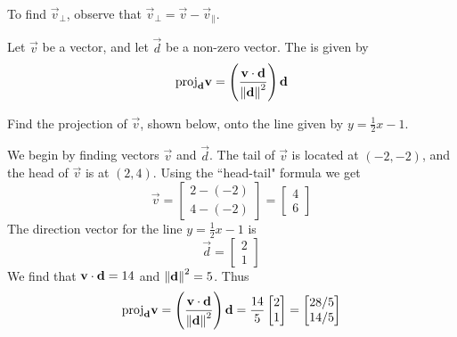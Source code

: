 \documentclass{ximera}
\begin{document}
To find $\vec{v}_{\perp}$, observe that $\vec{v}_{\perp}=\vec{v}-\vec{v}_{\parallel}$.


\begin{definition}\label{def:projection}
Let $\vec{v}$ be a vector, and let $\vec{d}$ be a non-zero vector.  The  is given by 
$$\mbox{proj}_{\mathbf{d}}\mathbf{v}=\left(\frac{\mathbf{v}\cdot\mathbf{d}}{\left\lVert\mathbf{d}\right\rVert^2}\right)\mathbf{d}$$
\end{definition}

\begin{example}\label{ex:projection1}
Find the projection of $\vec{v}$, shown below, onto the line given by $y=\frac{1}{2}x-1$.

\begin{center}
\end{center}

\begin{explanation}
We begin by finding vectors $\vec{v}$ and $\vec{d}$. The tail of $\vec{v}$ is located at $(-2, -2)$, and the head of $\vec{v}$ is at $(2, 4)$.  Using the ``head-tail" formula we get 
$$\vec{v}=\begin{bmatrix}2-(-2)\\4-(-2)\end{bmatrix}=\begin{bmatrix}4\\6\end{bmatrix}$$ The direction vector for the line $y=\frac{1}{2}x-1$ is $$\vec{d}=\begin{bmatrix}2\\1\end{bmatrix}$$
We find that $\mathbf{v}\cdot\mathbf{d}=14$ and $\left\lVert\mathbf{d}\right\rVert^2=5$.
Thus $$\mbox{proj}_{\mathbf{d}}\mathbf{v}=\left(\frac{\mathbf{v}\cdot\mathbf{d}}{\left\lVert\mathbf{d}\right\rVert^2}\right)\mathbf{d}=\frac{14}{5}\begin{bmatrix}2\\1\end{bmatrix}=\begin{bmatrix}28/5\\14/5\end{bmatrix}$$
\end{explanation}
\end{example}
\end{document}
